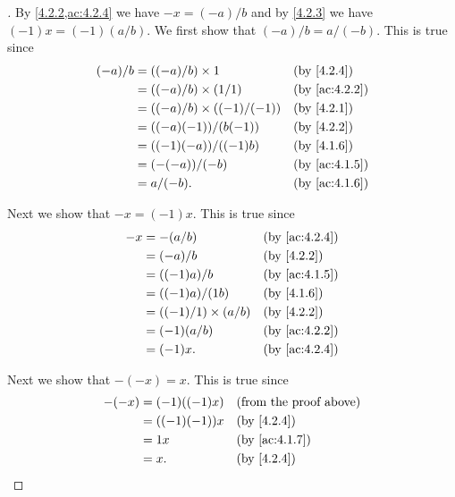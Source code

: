 \begin{proof}[]
  By \cref{4.2.2,ac:4.2.4} we have \(-x = (-a) / b\) and by \cref{4.2.3} we have \((-1) x = (-1) (a / b)\).
  We first show that \((-a) / b = a / (-b)\).
  This is true since
  \begin{align*}
    (-a) / b & = ((-a) / b) \times 1             &  & \by{4.2.4}    \\
             & = ((-a) / b) \times (1 / 1)       &  & \by{ac:4.2.2} \\
             & = ((-a) / b) \times ((-1) / (-1)) &  & \by{4.2.1}    \\
             & = ((-a) (-1)) / (b (-1))          &  & \by{4.2.2}    \\
             & = ((-1) (-a)) / ((-1) b)          &  & \by{4.1.6}    \\
             & = (-(-a)) / (-b)                  &  & \by{ac:4.1.5} \\
             & = a / (-b).                       &  & \by{ac:4.1.6}
  \end{align*}

  Next we show that \(-x = (-1) x\).
  This is true since
  \begin{align*}
    -x & = -(a / b)                  &  & \by{ac:4.2.4} \\
       & = (-a) / b                  &  & \by{4.2.2}    \\
       & = ((-1) a) / b              &  & \by{ac:4.1.5} \\
       & = ((-1) a) / (1b)           &  & \by{4.1.6}    \\
       & = ((-1) / 1) \times (a / b) &  & \by{4.2.2}    \\
       & = (-1) (a / b)              &  & \by{ac:4.2.2} \\
       & = (-1) x.                   &  & \by{ac:4.2.4}
  \end{align*}

  Next we show that \(-(-x) = x\).
  This is true since
  \begin{align*}
    -(-x) & = (-1) ((-1) x) &  & \text{(from the proof above)} \\
          & = ((-1) (-1)) x &  & \by{4.2.4}                    \\
          & = 1 x           &  & \by{ac:4.1.7}                 \\
          & = x.            &  & \by{4.2.4}
  \end{align*}


\end{proof}
